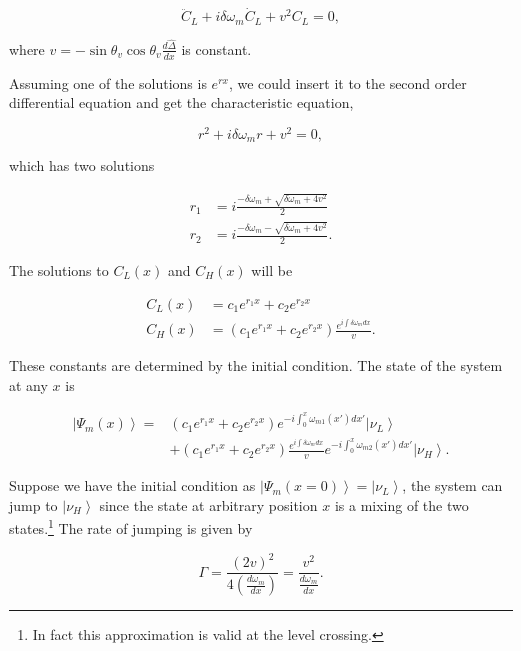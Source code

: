 \documentclass{tufte-handout}
\newcommand{\ket}[1]{\left| #1\right\rangle}
\begin{document}
\begin{equation*}
\ddot C_L + i\delta\omega_m \dot C_L + v^2 C_L = 0,
\end{equation*}

where $v=-\sin\theta_v\cos\theta_v \frac{d\hat\Delta}{dx}$ is constant.

Assuming one of the solutions is $e^{rx}$, we could insert it to the second order differential equation and get the characteristic equation,

\begin{equation*}
r^2 + i\delta \omega_m r + v^2 = 0,
\end{equation*}

which has two solutions

\begin{align*}
r_1 & =  i \frac{-\delta\omega_m + \sqrt{\delta\omega_m+ 4v^2} }{2} \\
r_2 & = i\frac{-\delta\omega_m - \sqrt{\delta\omega_m+ 4v^2} }{2}.
\end{align*}

The solutions to $C_L(x)$ and $C_H(x)$ will be

\begin{align*}
C_L(x) & = c_1 e^{r_1 x} + c_2 e^{r_2 x} \\
C_H(x) & = \left( c_1 e^{r_1 x} + c_2 e^{r_2 x} \right) \frac{ e^{ i\int \delta\omega_m dx } }{v} .
\end{align*}

These constants are determined by the initial condition. The state of the system at any $x$ is

\begin{align*}
\ket{\Psi_m(x)} = & \left( c_1 e^{r_1 x} + c_2 e^{r_2 x} \right) e^{-i\int_0^x \omega_{m1}(x') dx'} \ket{\nu_L}  \\
& + \left( c_1 e^{r_1 x} + c_2 e^{r_2 x} \right) \frac{ e^{ i\int \delta\omega_m dx } }{v} e^{-i\int_0^x \omega_{m2}(x') dx'} \ket{\nu_H}.
\end{align*}


Suppose we have the initial condition as $\ket{\Psi_m(x=0)} = \ket{\nu_L}$, the system can jump to $\ket{\nu_H}$ since the state at arbitrary position $x$ is a mixing of the two states.\footnote{In fact this approximation is valid at the level crossing.} The rate of jumping is given by\cite{Vutha2010,Zener1932,Rubbmark1981}

\begin{equation*}
\Gamma = \frac{(2v )^2}{4\left( \frac{d\omega_m}{dx} \right)} = \frac{v^2}{\frac{d\omega_m}{dx}}.
\end{equation*}
\end{document}
